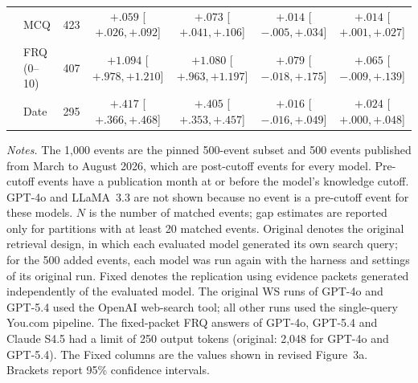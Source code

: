 \begin{table}[p]
\begin{tabular}{l l r c c c c}
& MCQ
& 423
& $+.059$ {\tiny[$+.026,+.092$]}
& $+.073$ {\tiny[$+.041,+.106$]}
& $+.014$ {\tiny[$-.005,+.034$]}
& $+.014$ {\tiny[$+.001,+.027$]} \\


& FRQ (0--10)
& 407
& $+1.094$ {\tiny[$+.978,+1.210$]}
& $+1.080$ {\tiny[$+.963,+1.197$]}
& $+.079$ {\tiny[$-.018,+.175$]}
& $+.065$ {\tiny[$-.009,+.139$]} \\


& Date
& 295
& $+.417$ {\tiny[$+.366,+.468$]}
& $+.405$ {\tiny[$+.353,+.457$]}
& $+.016$ {\tiny[$-.016,+.049$]}
& $+.024$ {\tiny[$+.000,+.048$]} \\
\bottomrule
\end{tabular}

\vspace{3pt}
\begin{minipage}{0.98\textwidth}
\scriptsize
\textit{Notes.}
The 1,000 events are the pinned 500-event subset and 500 events published from March to August 2026, which are post-cutoff events for every model.
Pre-cutoff events have a publication month at or before the model's knowledge cutoff. GPT-4o and LLaMA~3.3 are not shown because no event is a pre-cutoff event for these models.
$N$ is the number of matched events; gap estimates are reported only for partitions with at least 20 matched events.
Original denotes the original retrieval design, in which each evaluated model generated its own search query; for the 500 added events, each model was run again with the harness and settings of its original run.
Fixed denotes the replication using evidence packets generated independently of the evaluated model.
The original WS runs of GPT-4o and GPT-5.4 used the OpenAI web-search tool; all other runs used the single-query You.com pipeline.
The fixed-packet FRQ answers of GPT-4o, GPT-5.4 and Claude S4.5 had a limit of 250 output tokens (original: 2,048 for GPT-4o and GPT-5.4).
The Fixed columns are the values shown in revised Figure~3a.
Brackets report 95\% confidence intervals.
\end{minipage}

\end{table}
